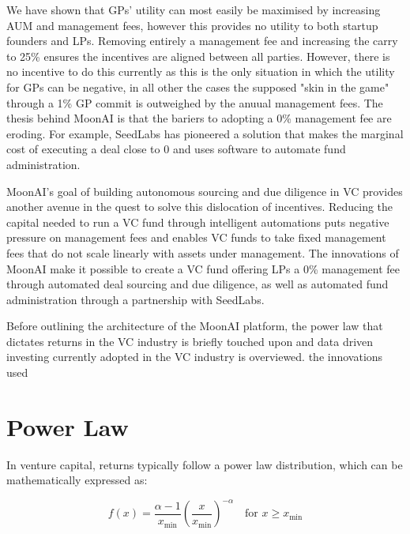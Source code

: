 \documentclass[a4paper, oneside]{discothesis}
\begin{document}
We have shown that GPs' utility can most easily be maximised by increasing AUM and management fees, however this provides no utility to both startup founders and LPs. Removing entirely a management fee and increasing the carry to 25\% ensures the incentives are aligned between all parties. However, there is no incentive to do this currently as this is the only situation in which the utility for GPs can be negative, in all other the cases the supposed "skin in the game" through a 1\% GP commit is outweighed by the anuual management fees. The thesis behind MoonAI is that the bariers to adopting a 0\% management fee are eroding. For example, SeedLabs has pioneered a solution that makes the marginal cost of executing a deal close to 0 and uses software to automate fund administration. 

MoonAI's goal of building autonomous sourcing and due diligence in VC provides another avenue in the quest to solve this dislocation of incentives. Reducing the capital needed to run a VC fund through intelligent automations puts negative pressure on management fees and enables VC funds to take fixed management fees that do not scale linearly with assets under management. The innovations of MoonAI make it possible to create a VC fund offering LPs a 0\% management fee through automated deal sourcing and due diligence, as well as automated fund administration through a partnership with SeedLabs. 

Before outlining the architecture of the MoonAI platform, the power law that dictates returns in the VC industry is briefly touched upon and data driven investing currently adopted in the VC industry is overviewed.  the innovations used 

\section{Power Law}

In venture capital, returns typically follow a power law distribution, which can be mathematically expressed as:

\begin{equation}
f(x) = \frac{\alpha - 1}{x_{\text{min}}} \left(\frac{x}{x_{\text{min}}}\right)^{-\alpha} \quad \text{for } x \geq x_{\text{min}}
\end{equation}
\end{document}
